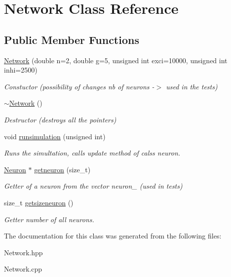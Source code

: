 \hypertarget{classNetwork}{\section{Network Class Reference}
\label{classNetwork}
}
\subsection*{Public Member Functions}
\begin{DoxyCompactItemize}
\item 
\hypertarget{classNetwork_a5a7f4788158d08f1b180e1bf39aae8b4}{\hyperlink{classNetwork_a5a7f4788158d08f1b180e1bf39aae8b4}{Network} (double n=2, double g=5, unsigned int exci=10000, unsigned int inhi=2500)}\label{classNetwork_a5a7f4788158d08f1b180e1bf39aae8b4}

\begin{DoxyCompactList}\small\item\em Constuctor (possibility of changes nb of neurons -\/$>$ used in the tests) \end{DoxyCompactList}\item 
\hypertarget{classNetwork_a7a4e19cdb4bf0c7ecf82baa643831492}{\hyperlink{classNetwork_a7a4e19cdb4bf0c7ecf82baa643831492}{$\sim$\-Network} ()}\label{classNetwork_a7a4e19cdb4bf0c7ecf82baa643831492}

\begin{DoxyCompactList}\small\item\em Destructor (destroys all the pointers) \end{DoxyCompactList}\item 
\hypertarget{classNetwork_ab59874bad4191179464d67abec9e6481}{void \hyperlink{classNetwork_ab59874bad4191179464d67abec9e6481}{runsimulation} (unsigned int)}\label{classNetwork_ab59874bad4191179464d67abec9e6481}

\begin{DoxyCompactList}\small\item\em Runs the simultation, calls update method of calss neuron. \end{DoxyCompactList}\item 
\hypertarget{classNetwork_a6959511f813566a6a69cea7482156b0d}{\hyperlink{classNeuron}{Neuron} $\ast$ \hyperlink{classNetwork_a6959511f813566a6a69cea7482156b0d}{getneuron} (size\-\_\-t)}\label{classNetwork_a6959511f813566a6a69cea7482156b0d}

\begin{DoxyCompactList}\small\item\em Getter of a neuron from the vector neuron\-\_\- (used in tests) \end{DoxyCompactList}\item 
\hypertarget{classNetwork_af0006b49937b5bfdb9debfd36a82d3d4}{size\-\_\-t \hyperlink{classNetwork_af0006b49937b5bfdb9debfd36a82d3d4}{getsizeneuron} ()}\label{classNetwork_af0006b49937b5bfdb9debfd36a82d3d4}

\begin{DoxyCompactList}\small\item\em Getter number of all neurons. \end{DoxyCompactList}\end{DoxyCompactItemize}


The documentation for this class was generated from the following files\-:\begin{DoxyCompactItemize}
\item 
Network.\-hpp\item 
Network.\-cpp\end{DoxyCompactItemize}
